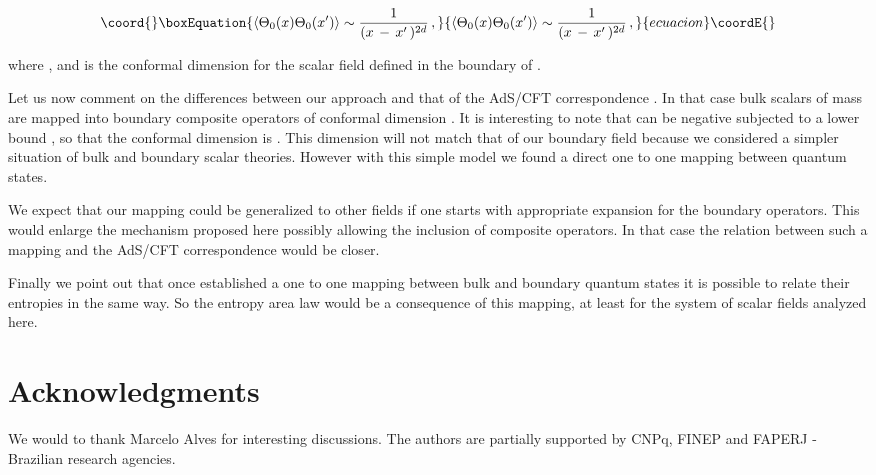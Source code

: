 \documentclass[a4paper,12pt]{article}
\begin{document}
{{\begin{equation}\coord{}\boxEquation{
\langle \Theta_{0}
( x )\Theta_{0}
( x^\prime )\rangle\sim { 1 \over ( x \,-\, x^\prime \,)^{2d} }\,,
}{
\langle \Theta_{0}
( x )\Theta_{0}
( x^\prime )\rangle\sim { 1 \over ( x \,-\, x^\prime \,)^{2d} }\,,
}{ecuacion}\coordE{}\end{equation}

\noindent where \coordHE{} , \coordHE{}
and \coordHE{} is the conformal dimension for the scalar field 
\coordHE{} defined in the boundary of  \coordHE{}.


Let us now comment on the differences between our approach and
that of the \break AdS\coordHE{}/CFT\coordHE{} correspondence \cite{Malda,GKP,Wi}.
In that case bulk scalars of mass \coordHE{} are mapped into boundary composite 
operators of conformal dimension \coordHE{}. 
It is interesting to note that \coordHE{} can be negative subjected to a lower 
bound \coordHE{} \cite{QAdS2,Wi}, so that the conformal dimension is 
\coordHE{}.
This dimension will not match that of our boundary field because we
considered a simpler situation of bulk and boundary scalar theories.
However with this simple model we found a direct one to one mapping 
between quantum states. 
   
We expect that our mapping could  be generalized to other  
fields if one starts with  appropriate expansion for the boundary operators.
This would enlarge the mechanism proposed here possibly
allowing the inclusion of composite operators. 
In that case the relation between such a mapping and the 
AdS/CFT correspondence would be closer.

Finally we point out that once established a  one to one mapping 
between  bulk and boundary quantum states it is possible to relate their 
entropies in the same way. So the entropy area law would 
be a  consequence of this mapping, at least for the system of 
scalar fields analyzed here.


 
\section*{Acknowledgments} 
We would to thank Marcelo Alves for interesting discussions. 
The authors are partially supported by CNPq, FINEP and FAPERJ 
- Brazilian research agencies. 

}}
\end{document}
